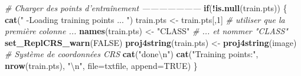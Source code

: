 \documentclass[a4paper, notitlepage, 12pt, krantz2]{krantz}
\newenvironment{Shaded}{\begin{snugshade}}{\end{snugshade}}
\newcommand{\CharTok}[1]{\textcolor[rgb]{0.31,0.60,0.02}{#1}}
\newcommand{\CommentTok}[1]{\textcolor[rgb]{0.56,0.35,0.01}{\textit{#1}}}
\newcommand{\ControlFlowTok}[1]{\textcolor[rgb]{0.13,0.29,0.53}{\textbf{#1}}}
\newcommand{\DataTypeTok}[1]{\textcolor[rgb]{0.13,0.29,0.53}{#1}}
\newcommand{\DecValTok}[1]{\textcolor[rgb]{0.00,0.00,0.81}{#1}}
\newcommand{\KeywordTok}[1]{\textcolor[rgb]{0.13,0.29,0.53}{\textbf{#1}}}
\newcommand{\NormalTok}[1]{#1}
\newcommand{\OperatorTok}[1]{\textcolor[rgb]{0.81,0.36,0.00}{\textbf{#1}}}
\newcommand{\OtherTok}[1]{\textcolor[rgb]{0.56,0.35,0.01}{#1}}
\newcommand{\StringTok}[1]{\textcolor[rgb]{0.31,0.60,0.02}{#1}}
\begin{document}
\begin{Shaded}
\begin{Highlighting}[]
  \CommentTok{# Charger des points d'entraînement ---------------------}
  \ControlFlowTok{if}\NormalTok{(}\OperatorTok{!}\KeywordTok{is.null}\NormalTok{(train.pts)) \{}
    \KeywordTok{cat}\NormalTok{(}\StringTok{"    -Loading training points ... "}\NormalTok{)}
\NormalTok{    train.pts <-}\StringTok{ }\NormalTok{train.pts[,}\DecValTok{1}\NormalTok{]      }\CommentTok{# utiliser que la première colonne ...}
    \KeywordTok{names}\NormalTok{(train.pts) <-}\StringTok{ "CLASS"}     \CommentTok{# ... et nommer "CLASS"}
    \KeywordTok{set_ReplCRS_warn}\NormalTok{(}\OtherTok{FALSE}\NormalTok{)}
    \KeywordTok{proj4string}\NormalTok{(train.pts) <-}\StringTok{ }\KeywordTok{proj4string}\NormalTok{(image)  }\CommentTok{# Système de coordonnées CRS}
    \KeywordTok{cat}\NormalTok{(}\StringTok{"done}\CharTok{\textbackslash{}n}\StringTok{"}\NormalTok{)}
    \KeywordTok{cat}\NormalTok{(}\StringTok{"Training points:"}\NormalTok{, }\KeywordTok{nrow}\NormalTok{(train.pts), }\StringTok{"}\CharTok{\textbackslash{}n}\StringTok{"}\NormalTok{, }\DataTypeTok{file=}\NormalTok{txtfile, }\DataTypeTok{append=}\OtherTok{TRUE}\NormalTok{)}
\NormalTok{  \}}
  

\end{Highlighting}
\end{Shaded}
\end{document}
